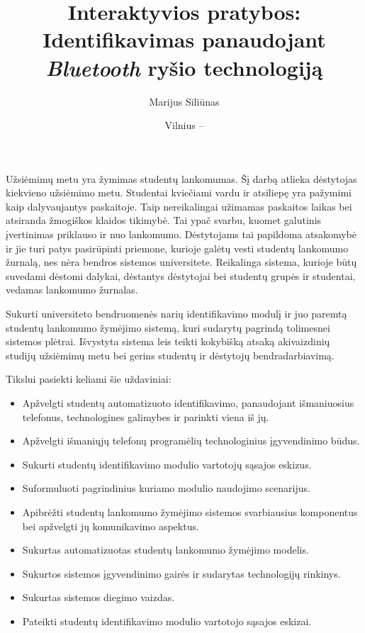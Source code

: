 \documentclass{VUMIFPSkursinis}
\title{Interaktyvios pratybos: Identifikavimas panaudojant \textit{Bluetooth} ryšio technologiją}
\author{Marijus Siliūnas}
\date{Vilnius – \the\year}
\begin{document}
\maketitle

\tableofcontents



Užsiėmimų metu yra žymimas studentų lankomumas. Šį darbą atlieka dėstytojas kiekvieno užsiėmimo metu. Studentai kviečiami vardu ir atsiliepę yra pažymimi kaip dalyvaujantys paskaitoje. Taip nereikalingai užimamas paskaitos laikas bei atsiranda žmogiškos klaidos tikimybė. Tai ypač svarbu, kuomet galutinis įvertinimas priklauso ir nuo lankomumo. Dėstytojams tai papildoma atsakomybė ir jie turi patys pasirūpinti priemone, kurioje galėtų vesti studentų lankomumo žurnalą, nes nėra bendros sistemos universitete.  Reikalinga sistema, kurioje būtų suvedami dėstomi dalykai, dėstantys dėstytojai bei studentų grupės ir studentai, vedamas lankomumo žurnalas.


Sukurti universiteto bendruomenės narių identifikavimo modulį ir juo paremtą studentų lankomumo žymėjimo sistemą, kuri sudarytų pagrindą tolimesnei sistemos plėtrai. Išvystyta sistema leis teikti kokybišką atsaką akivaizdinių studijų užsiėmimų metu bei gerins studentų ir dėstytojų bendradarbiavimą.


Tikslui pasiekti keliami šie uždaviniai:

\begin{itemize}
	\item Apžvelgti studentų automatizuoto identifikavimo, panaudojant išmaniuosius telefonus, technologines galimybes ir parinkti viena iš jų.
	\item Apžvelgti išmaniųjų telefonų programėlių technologinius įgyvendinimo būdus.
	\item Sukurti studentų identifikavimo modulio vartotojų sąsajos eskizus.
	\item Suformuluoti pagrindinius kuriamo modulio naudojimo scenarijus.
	\item Apibrėžti studentų lankomumo žymėjimo sistemos svarbiausius komponentus bei apžvelgti jų komunikavimo aspektus.
\end{itemize}


\begin{itemize}
	\item Sukurtas automatizuotas studentų lankomumo žymėjimo modelis.
	\item Sukurtos sistemos įgyvendinimo gairės ir sudarytas technologijų rinkinys.
	\item Sukurtas sistemos diegimo vaizdas.
	\item Pateikti studentų identifikavimo modulio vartotojo sąsajos eskizai.
\end{itemize}
\end{document}
